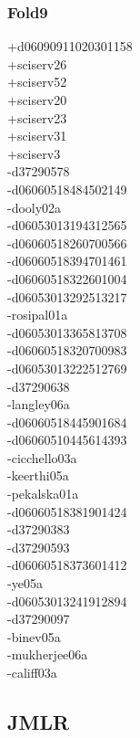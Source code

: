 \begin{multicols}{4}
\subsubsection*{Fold9}
+d06090911020301158\\
+sciserv26\\
+sciserv52\\
+sciserv20\\
+sciserv23\\
+sciserv31\\
+sciserv3\\
-d37290578\\
-d06060518484502149\\
-dooly02a\\
-d06053013194312565\\
-d06060518260700566\\
-d06060518394701461\\
-d06060518322601004\\
-d06053013292513217\\
-rosipal01a\\
-d06053013365813708\\
-d06060518320700983\\
-d06053013222512769\\
-d37290638\\
-langley06a\\
-d06060518445901684\\
-d06060510445614393\\
-cicchello03a\\
-keerthi05a\\
-pekalska01a\\
-d06060518381901424\\
-d37290383\\
-d37290593\\
-d06060518373601412\\
-ye05a\\
-d06053013241912894\\
-d37290097\\
-binev05a\\
-mukherjee06a\\
-califf03a\\
\subsection*{JMLR}

\end{multicols}
